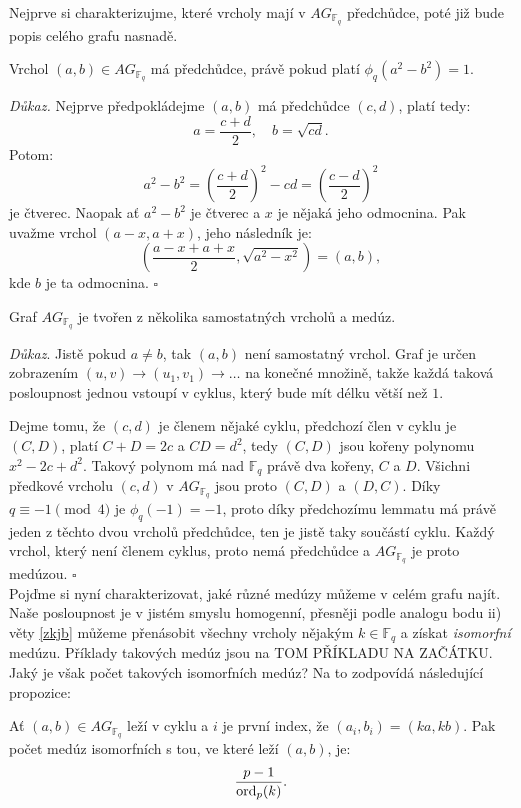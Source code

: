 \documentclass[12pt]{report}
\begin{document}
Nejprve si charakterizujme, které vrcholy mají v $AG_{\mathbb{F}_q}$ předchůdce, poté již bude popis celého grafu nasnadě.

\begin{lemma}
Vrchol $(a,b) \in AG_{\mathbb{F}_q}$ má předchůdce, právě pokud platí $\phi_q(a^2-b^2)=1$.
\end{lemma}

\noindent \textit{Důkaz.} Nejprve předpokládejme $(a,b)$ má předchůdce $(c,d)$, platí tedy:
\begin{equation*}
a = \frac{c+d}{2}, \quad b = \sqrt{cd}.
\end{equation*}
Potom:
\begin{equation*}
a^2 - b^2 = \left(\frac{c+d}{2} \right)^2 - cd = \left( \frac{c-d}{2} \right)^2
\end{equation*}
je čtverec. Naopak ať $a^2-b^2$ je čtverec a $x$ je nějaká jeho odmocnina. Pak uvažme vrchol $(a-x,a+x)$, jeho následník je: $$\left(\frac{a-x+a+x}{2}, \sqrt{a^2-x^2} \right)= \left(a, b \right),$$
kde $b$ je ta  odmocnina. \hfill $\square$
\begin{veta}\label{meduzy}
Graf $AG_{\mathbb{F}_q}$ je tvořen z několika samostatných vrcholů a medúz.
\end{veta}
\noindent \textit{Důkaz}. Jistě pokud $a \neq b$, tak $(a,b)$ není samostatný vrchol. Graf je určen zobrazením $(u,v) \longrightarrow (u_1,v_1) \longrightarrow \dots$ na konečné množině, takže každá taková posloupnost jednou vstoupí v cyklus, který bude mít délku větší než $1$. 

Dejme tomu, že $(c,d)$ je členem nějaké cyklu, předchozí člen v cyklu je $(C,D)$, platí $C+D=2c$ a $CD = d^2$, tedy $(C,D)$ jsou kořeny polynomu $x^2-2c+d^2$. Takový polynom má nad $\mathbb{F}_q$ právě dva kořeny, $C$ a $D$. Všichni předkové vrcholu $(c,d)$ v $AG_{\mathbb{F}_q}$ jsou proto $(C,D)$ a $(D,C)$. Díky $q \equiv -1 \pmod{4}$ je $\phi_q(-1)=-1$, proto díky předchozímu lemmatu má právě jeden z těchto dvou vrcholů předchůdce, ten je jistě taky součástí cyklu. Každý vrchol, který není členem cyklus, proto nemá předchůdce a $AG_{\mathbb{F}_q}$ je proto medúzou. \hfill $\square$\\


Pojďme si nyní charakterizovat, jaké různé medúzy můžeme v celém grafu najít. Naše posloupnost je v jistém smyslu homogenní, přesněji podle analogu bodu ii) věty \ref{zkjb}  můžeme přenásobit všechny vrcholy nějakým $k \in \mathbb{F}_q$ a získat \textit{isomorfní} medúzu. Příklady takových medúz jsou na TOM PŘÍKLADU NA ZAČÁTKU. Jaký je však počet takových isomorfních medúz? Na to zodpovídá následující propozice:
\begin{veta}
Ať $(a,b) \in AG_{\mathbb{F}_q}$ leží v cyklu a $i$ je první index, že $(a_i,b_i) = (ka, kb)$. Pak počet medúz isomorfních s tou, ve které leží $(a,b)$, je:
$$\frac{p-1}{\operatorname{ord}_p (k)}.$$
\end{veta}
\end{document}
